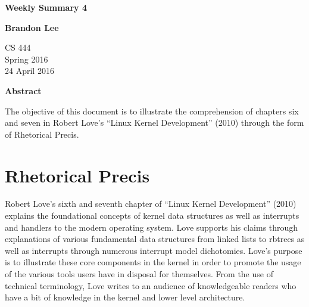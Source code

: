 \documentclass[letterpaper,10pt,titlepage]{article}
\begin{document}
\begin{titlepage}
    \begin{center}
        \vspace*{3.5cm}

        \textbf{Weekly Summary 4}

        \vspace{0.5cm}

        \textbf{Brandon Lee}

        \vspace{0.8cm}

        CS 444\\
        Spring 2016\\
        24 April 2016\\

        \vspace{1cm}

        \textbf{Abstract}\\

        \vspace{0.5cm}

        The objective of this document is to illustrate the comprehension of chapters six and seven in Robert Love's “Linux Kernel Development” (2010) through the form of Rhetorical Precis.


        \vfill



    \end{center}
\end{titlepage}

\newpage

\section{Rhetorical Precis}

Robert Love's sixth and seventh chapter of “Linux Kernel Development” (2010) explains the foundational concepts of kernel data structures as well as interrupts and handlers to the modern operating system.  Love supports his claims through explanations of various fundamental data structures from linked lists to rbtrees as well as interrupts through numerous interrupt model dichotomies.  Love's purpose is to illustrate these core components in the kernel in order to promote the usage of the various tools users have in disposal for themselves.  From the use of technical terminology, Love writes to an audience of knowledgeable readers who have a bit of knowledge in the kernel and lower level architecture.
\end{document}
